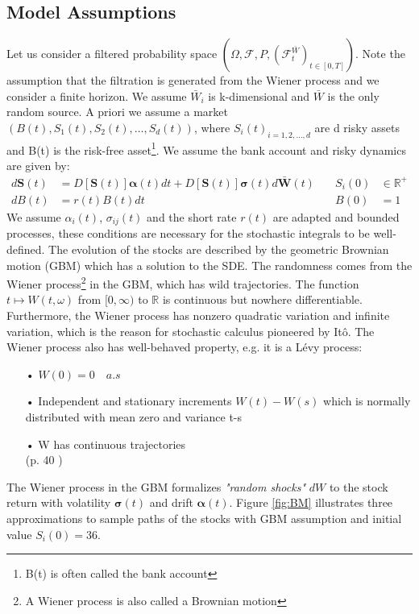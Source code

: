 \subsection{Model Assumptions}
Let us consider a filtered probability space $(\Omega, \mathcal{F}, P, (\mathcal{F}_t^{\bar{W}})_{t \in [0,T]})$. Note the assumption that the filtration is generated from the Wiener process and we consider a finite horizon. We assume $\bar{W}_i$ is k-dimensional and $\bar{W}$ is the only random source. A priori we assume a market $(B(t),S_1(t), S_2(t),\ldots, S_d(t))$, where ${S_i(t)}_{i=1,2,\ldots,d}$ are d risky assets and B(t) is the risk-free asset\footnote{B(t) is often called the bank account}. We assume the bank account and risky dynamics are given by:\\
\begin{align}
d\bm{S}(t)&=D[\bm{S}(t)]\bm{\alpha}(t)dt+D[\bm{S}(t)]\bm{\sigma}(t)d\bar{\bm{W}}(t) \quad & S_i(0) &\in \mathbb{R}^+ \label{GBM-P} \\
dB(t)&=r(t)B(t)dt \quad & B(0) &= 1
\end{align}
We assume $\alpha_i(t)$, $\sigma_{ij}(t)$ and the short rate $r(t)$ are adapted and bounded processes, these conditions are necessary for the stochastic integrals to be well-defined. The evolution of the stocks are described by the geometric Brownian motion (GBM) which has a solution to the SDE. The randomness comes from the Wiener process\footnote{A Wiener process is also called a Brownian motion} in the GBM, which has wild trajectories. The function $t\mapsto W(t,\omega)$ from $[0,\infty)$ to $\mathbb{R}$ is continuous but nowhere differentiable. Furthermore, the Wiener process has nonzero quadratic variation and infinite variation, which is the reason for stochastic calculus pioneered by Itô. The Wiener process also has well-behaved property, e.g. it is a Lévy process:
\begin{enumerate}
\item[•] $W(0)=0 \quad a.s$
\item[•] Independent and stationary increments $W(t)-W(s)$ which is normally distributed with mean zero and variance t-s
\item[•] W has continuous trajectories\\
\null \hfill (p. 40 \parencite{finKont})
\end{enumerate}
The Wiener process in the GBM formalizes \textsl{"random shocks"} $dW$ to the stock return with volatility $\bm{\sigma}(t)$ and drift $\bm{\alpha}(t)$. Figure \ref{fig:BM} illustrates three approximations to sample paths of the stocks with GBM assumption and initial value $S_{i}(0)=36$.\\

